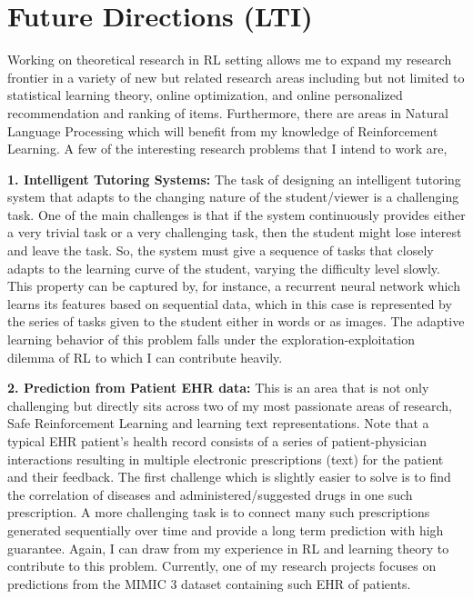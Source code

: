 \documentclass{article}
\begin{document}
	
\vspace*{-2em}
\section{Future Directions (LTI)}
\vspace*{-1em}

Working on theoretical research in RL setting allows me to expand my research frontier in a variety of new but related research areas including but not limited to statistical learning theory, online optimization, and online personalized recommendation and ranking of items. Furthermore, there are areas in Natural Language Processing which will benefit from my knowledge of Reinforcement Learning. A few of the interesting research problems that I intend to work are,

\textbf{1. Intelligent Tutoring Systems:} The task of designing an intelligent tutoring system that adapts to the changing nature of the student/viewer is a challenging task. One of the main challenges is that if the system continuously provides either a very trivial task or a very challenging task, then the student might lose interest and leave the task. So, the system must give a sequence of tasks that closely adapts to the learning curve of the student, varying the difficulty level slowly. This property can be captured by, for instance, a recurrent neural network which learns its features based on sequential data, which in this case is represented by the series of tasks given to the student either in words or as images. The adaptive learning behavior of this problem falls under the exploration-exploitation dilemma of RL to which I can contribute heavily.

\textbf{2. Prediction from Patient EHR data:} This is an area that is not only challenging but directly sits across two of my most passionate areas of research, Safe Reinforcement Learning and learning text representations. Note that a typical EHR patient's health record consists of a series of patient-physician interactions resulting in multiple electronic prescriptions (text) for the patient and their feedback. The first challenge which is slightly easier to solve is to find the correlation of diseases and administered/suggested drugs in one such prescription. A more challenging task is to connect many such prescriptions generated sequentially over time and provide a long term prediction with high guarantee. Again, I can draw from my experience in RL and learning theory to contribute to this problem. Currently, one of my research projects focuses on predictions from the MIMIC 3 dataset containing such EHR of patients.
\end{document}
